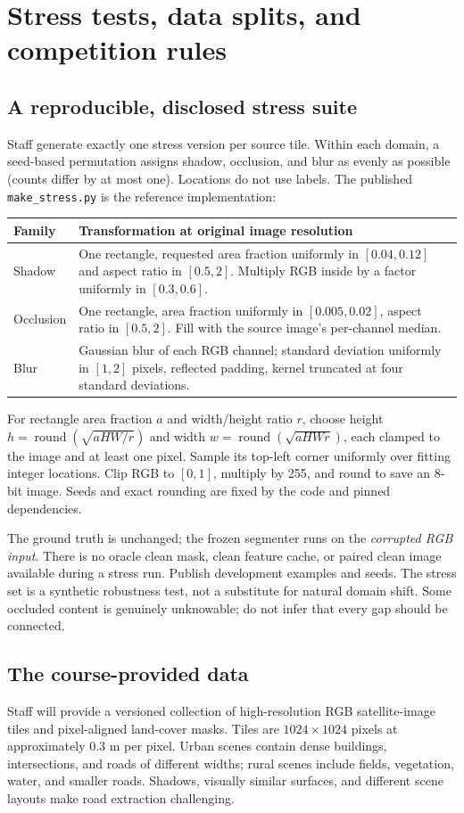 \documentclass[11pt,letterpaper]{article}
\newcommand{\page}[1]{\clearpage\section{#1}}
\begin{document}
\page{Stress tests, data splits, and competition rules}
\subsection{A reproducible, disclosed stress suite}
Staff generate exactly one stress version per source tile. Within each domain, a seed-based permutation assigns shadow, occlusion, and blur as evenly as possible (counts differ by at most one). Locations do not use labels. The published \texttt{make\_stress.py} is the reference implementation:
\begin{center}\small
\begin{tabularx}{\linewidth}{@{}p{0.85in}X@{}}
\toprule
Family & Transformation at original image resolution\\\midrule
Shadow & One rectangle, requested area fraction uniformly in $[0.04,0.12]$ and aspect ratio in $[0.5,2]$. Multiply RGB inside by a factor uniformly in $[0.3,0.6]$.\\
Occlusion & One rectangle, area fraction uniformly in $[0.005,0.02]$, aspect ratio in $[0.5,2]$. Fill with the source image's per-channel median.\\
Blur & Gaussian blur of each RGB channel; standard deviation uniformly in $[1,2]$ pixels, reflected padding, kernel truncated at four standard deviations.\\
\bottomrule
\end{tabularx}\end{center}
For rectangle area fraction $a$ and width/height ratio $r$, choose height $h=\operatorname{round}(\sqrt{aHW/r})$ and width $w=\operatorname{round}(\sqrt{aHWr})$, each clamped to the image and at least one pixel. Sample its top-left corner uniformly over fitting integer locations. Clip RGB to $[0,1]$, multiply by 255, and round to save an 8-bit image. Seeds and exact rounding are fixed by the code and pinned dependencies.

The ground truth is unchanged; the frozen segmenter runs on the \emph{corrupted RGB input}. There is no oracle clean mask, clean feature cache, or paired clean image available during a stress run. Publish development examples and seeds. The stress set is a synthetic robustness test, not a substitute for natural domain shift. Some occluded content is genuinely unknowable; do not infer that every gap should be connected.

\subsection{The course-provided data}
Staff will provide a versioned collection of high-resolution RGB satellite-image tiles and pixel-aligned land-cover masks. Tiles are $1024\times1024$ pixels at approximately 0.3 m per pixel. Urban scenes contain dense buildings, intersections, and roads of different widths; rural scenes include fields, vegetation, water, and smaller roads. Shadows, visually similar surfaces, and different scene layouts make road extraction challenging.
\end{document}
